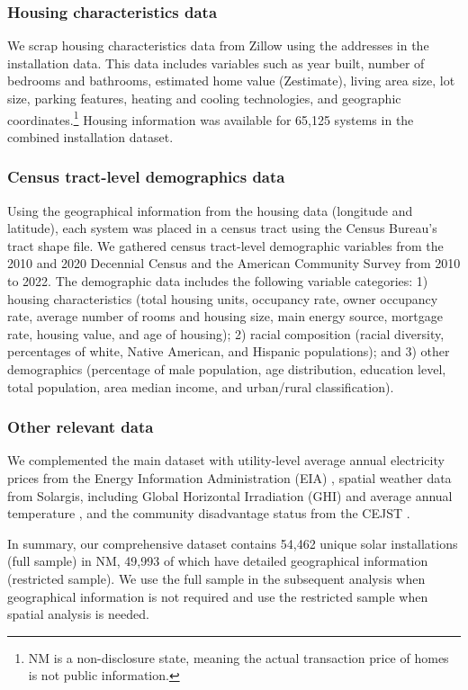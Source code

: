 \documentclass[12pt,twoside,letterpaper]{article}
\begin{document}
\subsubsection{Housing characteristics data}

We scrap housing characteristics data from Zillow using the addresses in the installation data. This data includes variables such as year built, number of bedrooms and bathrooms, estimated home value (Zestimate), living area size, lot size, parking features, heating and cooling technologies, and geographic coordinates.\footnote{NM is a non-disclosure state, meaning the actual transaction price of homes is not public information.} Housing information was available for 65,125 systems in the combined installation dataset.

\subsubsection{Census tract-level demographics data}

Using the geographical information from the housing data (longitude and latitude), each system was placed in a census tract using the Census Bureau’s tract shape file. We gathered census tract-level demographic variables from the 2010 and 2020 Decennial Census and the American Community Survey from 2010 to 2022. The demographic data includes the following variable categories: 1) housing characteristics (total housing units, occupancy rate, owner occupancy rate, average number of rooms and housing size, main energy source, mortgage rate, housing value, and age of housing); 2) racial composition (racial diversity, percentages of white, Native American, and Hispanic populations); and 3) other demographics (percentage of male population, age distribution, education level, total population, area median income, and urban/rural classification).

\subsubsection{Other relevant data}

We complemented the main dataset with utility-level average annual electricity prices from the Energy Information Administration (EIA) \parencite{eiaprice}, spatial weather data from Solargis, including Global Horizontal Irradiation (GHI) and average annual temperature \parencite{solargis}, and the community disadvantage status from the CEJST \parencite{cejst}.

In summary, our comprehensive dataset contains 54,462 unique solar installations (full sample) in NM, 49,993 of which have detailed geographical information (restricted sample). We use the full sample in the subsequent analysis when geographical information is not required and use the restricted sample when spatial analysis is needed.
\end{document}

